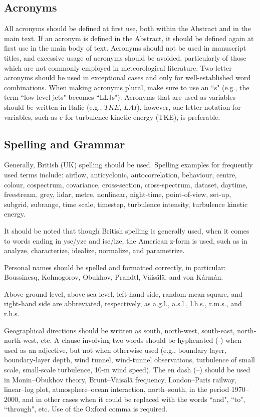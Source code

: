 \subsection{Acronyms}
All acronyms should be defined at first use, both within the Abstract and in the main text. If an acronym is defined in the Abstract, it should be defined again at first use in the main body of text. Acronyms should not be used in manuscript titles, and excessive usage of acronyms should be avoided, particularly of those which are not commonly employed in meteorological literature. Two-letter acronyms should be used in exceptional cases and only for well-established word combinations. When making acronyms plural, make sure to use an ``s" (e.g., the term ``low-level jets" becomes ``LLJs"). Acronyms that are used as variables should be written in Italic (e.g., $TKE$, $LAI$), however, one-letter notation for variables, such as $e$ for turbulence kinetic energy (TKE), is preferable.

\subsection{Spelling and Grammar}
Generally, British (UK) spelling should be used. Spelling examples for frequently used terms include: airflow, anticyclonic, autocorrelation, behaviour, centre, colour, cospectrum, covariance, cross-section, cross-spectrum, dataset, daytime, freestream, grey, lidar, metre, nonlinear, night-time, point-of-view, set-up, subgrid, subrange, time scale, timestep, turbulence intensity, turbulence kinetic energy.

It should be noted that though British spelling is generally used, when it comes to words ending in yse/yze and ise/ize, the American z-form is used, such as in analyze, characterize, idealize, normalize, and parametrize.

Personal names should be spelled and formatted correctly, in particular: Boussinesq, Kolmogorov, Obukhov, Prandtl, V{\"a}is{\"a}l{\"a}, and von K{\'a}rm{\'a}n.

Above ground level, above sea level, left-hand side, random mean square, and right-hand side are abbreviated, respectively, as a.g.l., a.s.l., l.h.s., r.m.s., and r.h.s.

Geographical directions should be written as south, north-west, south-east, north-north-west, etc. A clause involving two words should be hyphenated (-) when used as an adjective, but not when otherwise used (e.g., boundary layer, boundary-layer depth, wind tunnel, wind-tunnel observations, turbulence of small scale, small-scale turbulence, 10-m wind speed). The en dash (--) should be used in Monin--Obukhov theory, Brunt--V{\"a}is{\"a}l{\"a} frequency, London--Paris railway, linear--log plot, atmosphere--ocean interaction, north--south, in the period 1970--2000, and in other cases when it could be replaced with the words ``and", ``to", ``through", etc. Use of the Oxford comma is required.

